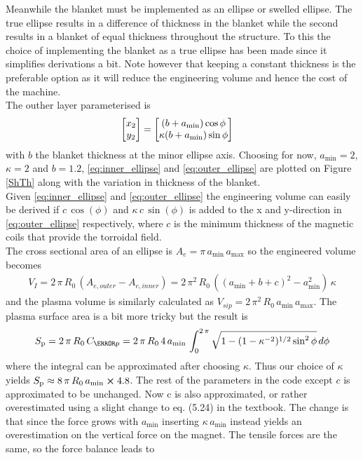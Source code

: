 Meanwhile the blanket must be implemented as an ellipse or swelled ellipse. The true ellipse results in a difference of thickness in the blanket while the second results in a blanket of equal thickness throughout the structure. To this the choice of implementing the blanket as a true ellipse has been made since it simplifies derivations a bit. Note however that keeping a constant thickness is the preferable option as it will reduce the engineering volume and hence the cost of the machine.\\
The outher layer parameterised is
\begin{align}
    \mqty[x_2 \\y_2] &= \mqty[\pqty{b+a_{\min}}\cos{\phi}\\\kappa \pqty{b+a_{\min}}\sin{\phi}]
    \label{eq:outer_ellipse}
\end{align}
with $b$ the blanket thickness at the minor ellipse axis. Choosing for now, $a_{\min}=2$, $\kappa=2$ and $b=1.2$, \ref{eq:inner_ellipse} and \ref{eq:outer_ellipse} are plotted on Figure \ref{ShTh} along with the variation in thickness of the blanket. \\
Given \ref{eq:inner_ellipse} and \ref{eq:outer_ellipse} the engineering volume can easily be derived if $c\,\cos(\phi)$ and $\kappa\, c\,\sin(\phi)$ is added to the x and y-direction in \ref{eq:outer_ellipse} respectively, where $c$ is the minimum thickness of the magnetic coils that provide the torroidal field. \\
The cross sectional area of an ellipse is $A_{\si{e}}=\pi\, a_{\min}\, a_{\max}$ so the engineered volume becomes
\begin{align}
    V_{\si{I}}=2\,\pi\, R_{0}\,(A_{\si{e,outer}}-A_{\si{e,inner}})=2\,\pi^{2}\, R_{0}\,\left(\left(a_{\min}+b+c\right)^{2}-a_{\min}^{2}\right)\,\kappa
    \label{eq:engineered_volume}
\end{align}
and the plasma volume is similarly calculated as $V_{si{p}}=2\,\pi^2\, R_{0}\, a_{\min}\, a_{\max}$. The plasma surface area is a bit more tricky but the result is
\begin{align}
    S_{\si{p}}=2\,\pi\, R_{0}\, C_{\s{p}}=2\,\pi\, R_{0}\, 4\, a_{\min}\,\int_{0}^{2\,\pi}\sqrt{1-(1-\kappa^{-2})^{1/2}\sin^{2}{\phi}} \, d\si{\phi}
\end{align}
where the integral can be approximated after choosing $\kappa$. Thus our choice of $\kappa$ yields $S_{\si{p}}\approx 8\,\pi\, R_{0}\,a_{\min}\cross 4.8$. The rest of the parameters in the code except $c$ is approximated to be unchanged. Now c is also approximated, or rather overestimated using a slight change to eq. (5.24) in the textbook. The change is that since the force grows with $a_{\min}$ inserting $\kappa\, a_{\min}$ instead yields an overestimation on the vertical force on the magnet. The tensile forces are the same, so the force balance leads to 
